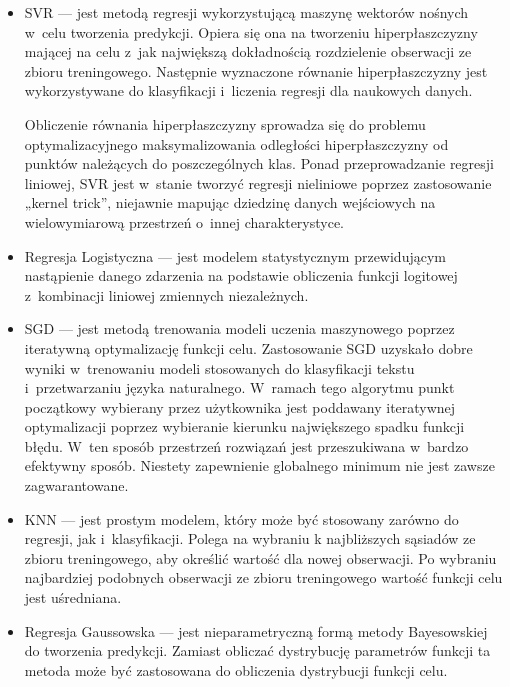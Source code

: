 \begin{itemize}
    \item SVR — jest metodą regresji wykorzystującą maszynę wektorów nośnych w~celu tworzenia
    predykcji. Opiera się ona na tworzeniu hiperpłaszczyzny mającej na celu z~jak największą
    dokładnością rozdzielenie obserwacji ze zbioru treningowego. Następnie wyznaczone
    równanie hiperpłaszczyzny jest wykorzystywane do klasyfikacji i~liczenia regresji dla naukowych
    danych.

    Obliczenie równania hiperpłaszczyzny sprowadza się do problemu optymalizacyjnego
    maksymalizowania odległości hiperpłaszczyzny od punktów należących do poszczególnych klas.
    Ponad przeprowadzanie regresji liniowej, SVR jest w~stanie tworzyć regresji nieliniowe
    poprzez zastosowanie „kernel trick'', niejawnie mapując dziedzinę danych wejściowych na 
    wielowymiarową przestrzeń o~innej charakterystyce.
    
    \item Regresja Logistyczna — jest modelem statystycznym przewidującym nastąpienie danego
    zdarzenia na podstawie obliczenia funkcji logitowej z~kombinacji liniowej zmiennych 
    niezależnych.

    \item SGD — jest metodą trenowania modeli uczenia maszynowego poprzez iteratywną optymalizację
    funkcji celu. Zastosowanie SGD uzyskało dobre wyniki w~trenowaniu modeli stosowanych
    do klasyfikacji tekstu i~przetwarzaniu języka naturalnego. W~ramach tego algorytmu
    punkt początkowy wybierany przez użytkownika jest poddawany iteratywnej optymalizacji
    poprzez wybieranie kierunku największego spadku funkcji błędu. W~ten sposób przestrzeń rozwiązań
    jest przeszukiwana w~bardzo efektywny sposób. Niestety zapewnienie globalnego minimum
    nie jest zawsze zagwarantowane.

    \item KNN — jest prostym modelem, który może być stosowany zarówno do regresji, jak i~klasyfikacji.
    Polega na wybraniu k najbliższych sąsiadów ze zbioru treningowego, aby określić wartość dla nowej
    obserwacji. Po wybraniu najbardziej podobnych obserwacji ze zbioru treningowego wartość funkcji
    celu jest uśredniana.

    \item Regresja Gaussowska — jest nieparametryczną formą metody Bayesowskiej do tworzenia
    predykcji. Zamiast obliczać dystrybucję parametrów funkcji ta metoda może być zastosowana do
    obliczenia dystrybucji funkcji celu.
    

\end{itemize}
